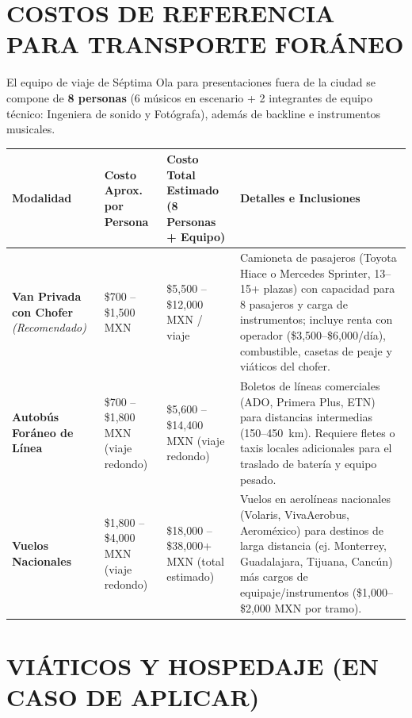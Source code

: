 \documentclass[a4paper,11pt]{article}
\newcommand{\sect}[1]{\vspace{0.4em}\section*{\normalfont\large\bfseries\MakeUppercase{#1}}\vspace{-0.2em}}
\begin{document}
\sect{Costos de Referencia para Transporte Foráneo}

El equipo de viaje de Séptima Ola para presentaciones fuera de la ciudad se compone de \textbf{8 personas} (6 músicos en escenario + 2 integrantes de equipo técnico: Ingeniera de sonido y Fotógrafa), además de backline e instrumentos musicales.

\begin{center}
    \renewcommand{\arraystretch}{1.25}
    \small
    \begin{tabularx}{\textwidth}{@{} >{\raggedright\arraybackslash}p{3.2cm} >{\raggedright\arraybackslash}p{2.5cm} >{\raggedright\arraybackslash}p{2.8cm} >{\raggedright\arraybackslash}X @{}}
        \toprule
        \textbf{Modalidad} & \textbf{Costo Aprox. por Persona} & \textbf{Costo Total Estimado (8 Personas + Equipo)} & \textbf{Detalles e Inclusiones} \\
        \midrule
        \textbf{Van Privada con Chofer} \newline\emph{(Recomendado)} & \$700 -- \$1,500 MXN & \$5,500 -- \$12,000 MXN / viaje & Camioneta de pasajeros (Toyota Hiace o Mercedes Sprinter, 13--15+ plazas) con capacidad para 8 pasajeros y carga de instrumentos; incluye renta con operador (\$3,500--\$6,000/día), combustible, casetas de peaje y viáticos del chofer. \\
        \midrule
        \textbf{Autobús Foráneo de Línea} & \$700 -- \$1,800 MXN \newline(viaje redondo) & \$5,600 -- \$14,400 MXN \newline(viaje redondo) & Boletos de líneas comerciales (ADO, Primera Plus, ETN) para distancias intermedias (150--450~km). Requiere fletes o taxis locales adicionales para el traslado de batería y equipo pesado. \\
        \midrule
        \textbf{Vuelos Nacionales} & \$1,800 -- \$4,000 MXN \newline(viaje redondo) & \$18,000 -- \$38,000+ MXN \newline(total estimado) & Vuelos en aerolíneas nacionales (Volaris, VivaAerobus, Aeroméxico) para destinos de larga distancia (ej. Monterrey, Guadalajara, Tijuana, Cancún) más cargos de equipaje/instrumentos (\$1,000--\$2,000 MXN por tramo). \\
        \bottomrule
    \end{tabularx}
\end{center}

\sect{Viáticos y Hospedaje (En Caso de Aplicar)}
\end{document}
